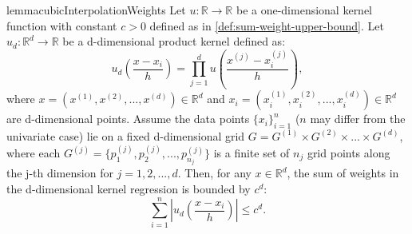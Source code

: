\begin{restatable}{lemma}{cubicInterpolationWeights}
\label{lemma:cubic-interpolation-weights-curse-dimensionality}
Let $u: \mathbb{R} \rightarrow \mathbb{R}$ be a one-dimensional kernel function with constant $c>0$ defined as in \ref{def:sum-weight-upper-bound}. Let $u_d: \mathbb{R}^d \rightarrow \mathbb{R}$ be a d-dimensional product kernel defined as:
$$
u_d\left(\frac{x - x_i}{h}\right) = \prod_{j=1}^d u\left(\frac{x^{(j)} - x_i^{(j)}}{h}\right),
$$
where $x = (x^{(1)}, x^{(2)}, ..., x^{(d)}) \in \mathbb{R}^d$ and $x_i = (x_i^{(1)}, x_i^{(2)}, ..., x_i^{(d)}) \in \mathbb{R}^d$ are d-dimensional points. Assume the data points $\{x_i\}_{i=1}^n$ ($n$ may differ from the univariate case) lie on a fixed d-dimensional grid $G = G^{(1)} \times G^{(2)} \times ... \times G^{(d)}$, where each $G^{(j)} = \{p_1^{(j)}, p_2^{(j)}, ..., p_{n_j}^{(j)}\}$ is a finite set of $n_j$ grid points along the j-th dimension for $j = 1, 2, ..., d$. Then, for any $x \in \mathbb{R}^d$, the sum of weights in the d-dimensional kernel regression is bounded by $c^d$:
$$
\sum_{i=1}^n \left|u_d\left(\frac{x - x_i}{h}\right) \right|\leq c^d.
$$
\end{restatable}

